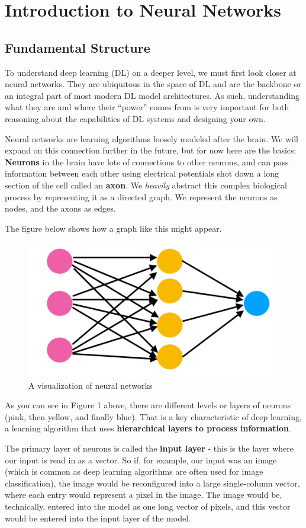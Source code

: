 \section{Introduction to Neural Networks}
\subsection{Fundamental Structure}
    \large {To understand deep learning (DL) on a deeper level, we must first look closer at neural networks. They are ubiquitous in the space of DL and are the backbone or an integral part of most modern DL model architectures. As such, understanding what they are and where their ``power'' comes from is very important for both reasoning about the capabilities of DL systems and designing your own.
    
    Neural networks are learning algorithms loosely modeled after the brain. We will expand on this connection further in the future, but for now here are the basics: \textbf{Neurons} in the brain have lots of connections to other neurons, and can pass information between each other using electrical potentials shot down a long section of the cell called an \textbf{axon}. We \textit{heavily} abstract this complex biological process by representing it as a directed graph. We represent the neurons as nodes, and the axons as edges. 
    
    The figure below shows how a graph like this might appear.}
    \begin{figure}[H]
        \centering
        \includegraphics[width=0.5\linewidth]{dl/neuralnetwork.png}
        \caption{A visualization of neural networks}
        \label{fig:neuralnetwork}
    \end{figure}

    \large {As you can see in Figure 1 above, there are different levels or layers of neurons (pink, then yellow, and finally blue). That is a key characteristic of deep learning, a learning algorithm that uses \textbf{hierarchical layers to process information}. 
    
    The primary layer of neurons is called the \textbf{input layer} - this is the layer where our input is read in as a vector. So if, for example, our input was an image (which is common as deep learning algorithms are often used for image classification), the image would be reconfigured into a large single-column vector, where each entry would represent a pixel in the image. The image would be, technically, entered into the model as one long vector of pixels, and this vector would be entered into the input layer of the model.}

